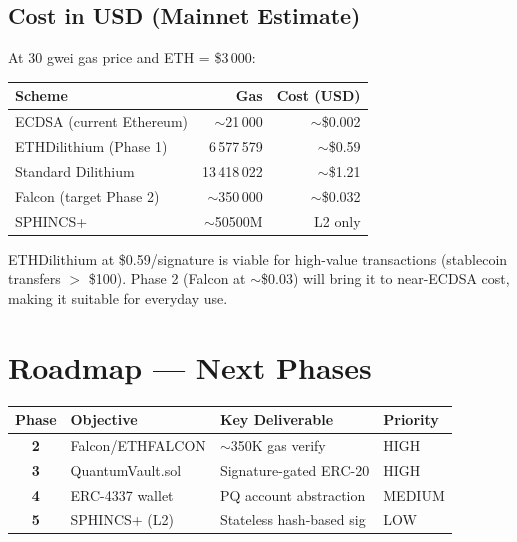 \documentclass[11pt,a4paper]{article}
\begin{document}
\subsection{Cost in USD (Mainnet Estimate)}

At 30 gwei gas price and ETH = \$3\,000:

\begin{center}
\begin{tabular}{lrr}
\toprule
\textbf{Scheme} & \textbf{Gas} & \textbf{Cost (USD)} \\
\midrule
ECDSA (current Ethereum) & $\sim$21\,000 & $\sim$\$0.002 \\
ETHDilithium (Phase 1) & 6\,577\,579 & $\sim$\$0.59 \\
Standard Dilithium & 13\,418\,022 & $\sim$\$1.21 \\
Falcon (target Phase 2) & $\sim$350\,000 & $\sim$\$0.032 \\
SPHINCS+ & $\sim$50\text{-}500M & L2 only \\
\bottomrule
\end{tabular}
\end{center}

\begin{infobox}[Observation]
ETHDilithium at \$0.59/signature is viable for high-value transactions (stablecoin transfers $>$ \$100). Phase 2 (Falcon at $\sim$\$0.03) will bring it to near-ECDSA cost, making it suitable for everyday use.
\end{infobox}

\section{Roadmap — Next Phases}

\begin{center}
\begin{tabular}{clll}
\toprule
\textbf{Phase} & \textbf{Objective} & \textbf{Key Deliverable} & \textbf{Priority} \\
\midrule
\textbf{2} & Falcon/ETHFALCON & $\sim$350K gas verify & HIGH \\
\textbf{3} & QuantumVault.sol & Signature-gated ERC-20 & HIGH \\
\textbf{4} & ERC-4337 wallet & PQ account abstraction & MEDIUM \\
\textbf{5} & SPHINCS+ (L2) & Stateless hash-based sig & LOW \\
\bottomrule
\end{tabular}
\end{center}
\end{document}
